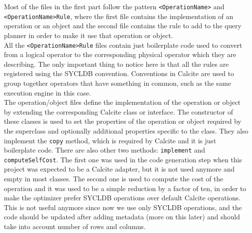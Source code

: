 \documentclass[a4paper, 10pt]{article}
\begin{document}
Most of the files in the first part follow the pattern \texttt{<OperationName>} and \texttt{<OperationName>Rule}, where the first file contains the implementation of an operation or an object and the second file contains the rule to add to the query planner in order to make it use that operation or object.
\\
All the \texttt{<OperationName>Rule} files contain just boilerplate code used to convert from a logical operator to the corresponding physical operator which they are describing. The only important thing to notice here is that all the rules are registered using the SYCLDB convention. Conventions in Calcite are used to group together operators that have something in common, such as the same execution engine in this case.
\\
The operation/object files define the implementation of the operation or object by extending the corresponding Calcite class or interface. The constructor of these classes is used to set the properties of the operation or object required by the superclass and optionally additional properties specific to the class. They also implement the \texttt{copy} method, which is required by Calcite and it is just boilerplate code. There are also other two methods: \texttt{implement} and \texttt{computeSelfCost}. The first one was used in the code generation step when this project was expected to be a Calcite adapter, but it is not used anymore and empty in most classes. The second one is used to compute the cost of the operation and it was used to be a simple reduction by a factor of ten, in order to make the optimizer prefer SYCLDB operations over default Calcite operations. This is not useful anymore since now we use only SYCLDB operations, and the code should be updated after adding metadata (more on this later) and should take into account number of rows and columns.
\end{document}

